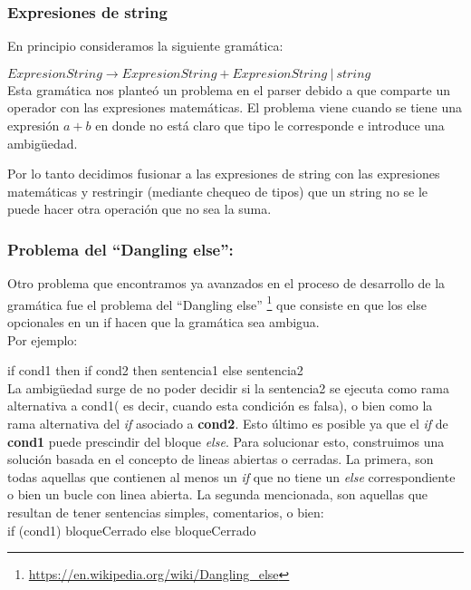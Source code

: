 \subsubsection{Expresiones de string}
En principio consideramos la siguiente gramática:

$ExpresionString \rightarrow ExpresionString + ExpresionString \ | \ string$ \\

Esta gramática nos planteó un problema en el parser debido a que comparte un operador con las expresiones matemáticas. El problema viene cuando se tiene una expresión $a+b$ en donde no está claro que tipo le corresponde e introduce una ambigüedad.

Por lo tanto decidimos fusionar a las expresiones de string con las expresiones matemáticas y restringir (mediante chequeo de tipos) que un string no se le puede hacer otra operación que no sea la suma.

\subsubsection{Problema del ``Dangling else'':}

Otro problema que encontramos ya avanzados en el proceso de desarrollo de la gramática fue el problema del ``Dangling else'' \footnote{\url{https://en.wikipedia.org/wiki/Dangling_else}} que consiste en que los else opcionales en un if hacen que la gramática sea ambigua. 
\\
Por ejemplo: 

if cond1 then if cond2 then sentencia1 else sentencia2 \\

La ambigüedad surge de no poder decidir si la sentencia2 se ejecuta como rama alternativa a cond1( es decir, cuando esta condición es falsa), o bien como la rama alternativa del \textit{if} asociado a \textbf{cond2}. Esto último es posible ya que el \textit{if} de \textbf{cond1} puede prescindir del bloque \textit{else}.
Para solucionar esto, construimos una solución basada en el concepto de lineas abiertas o cerradas. La primera, son todas aquellas que contienen al menos un \textit{if} que no tiene un \textit{else} correspondiente o bien un bucle con linea abierta. La segunda mencionada, son aquellas que resultan de tener sentencias simples, comentarios, o bien: \\

if (cond1) bloqueCerrado else bloqueCerrado \\

